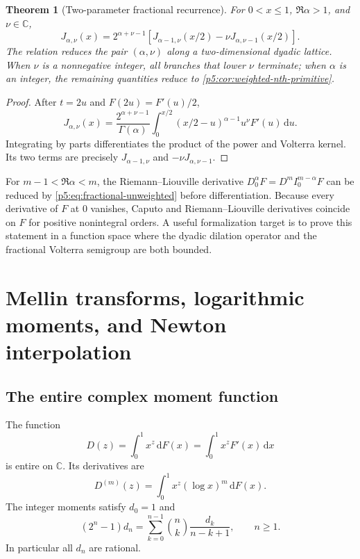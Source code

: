 \documentclass[11pt,oneside]{article}
\newtheorem{theorem}{Theorem}[section]
\theoremstyle{definition}
\theoremstyle{remark}
\newcommand{\C}{\mathbb C}
\newcommand{\dd}{\,\mathrm d}
\newcommand{\1}{\mathbf 1}
\begin{document}
\begin{theorem}[Two-parameter fractional recurrence]\label{p5:thm:fractional-weighted}
For $0<x\le1$, $\Re\alpha>1$, and $\nu\in\C$,
\begin{equation}\label{p5:eq:fractional-weighted}
\boxed{
 J_{\alpha,\nu}(x)=2^{\alpha+\nu-1}
 \left[J_{\alpha-1,\nu}(x/2)
       -\nu J_{\alpha,\nu-1}(x/2)\right].}
\end{equation}
The relation reduces the pair $(\alpha,\nu)$ along a two-dimensional dyadic lattice.  When $\nu$ is a nonnegative integer, all branches that lower $\nu$ terminate; when $\alpha$ is an integer, the remaining quantities reduce to \cref{p5:cor:weighted-nth-primitive}.
\end{theorem}

\begin{proof}
After $t=2u$ and $F(2u)=F'(u)/2$,
\[
 J_{\alpha,\nu}(x)=\frac{2^{\alpha+\nu-1}}{\Gamma(\alpha)}
 \int_0^{x/2}(x/2-u)^{\alpha-1}u^\nu F'(u)\dd u.
\]
Integrating by parts differentiates the product of the power and Volterra kernel.  Its two terms are precisely $J_{\alpha-1,\nu}$ and $-\nu J_{\alpha,\nu-1}$.
\end{proof}

\begin{remark}
For $m-1<\Re\alpha<m$, the Riemann--Liouville derivative
$D_0^\alpha F=D^mI_0^{m-\alpha}F$ can be reduced by \eqref{p5:eq:fractional-unweighted} before differentiation.  Because every derivative of $F$ at $0$ vanishes, Caputo and Riemann--Liouville derivatives coincide on $F$ for positive nonintegral orders.  A useful formalization target is to prove this statement in a function space where the dyadic dilation operator and the fractional Volterra semigroup are both bounded.
\end{remark}

\section{Mellin transforms, logarithmic moments, and Newton interpolation}

\subsection{The entire complex moment function}

\begin{proposition}\label{p5:prop:D-entire}
The function
\[
 D(z)=\int_0^1x^z\dd F(x)=\int_0^1x^zF'(x)\dd x
\]
is entire on $\C$.  Its derivatives are
\begin{equation}\label{p5:eq:D-derivatives}
 D^{(m)}(z)=\int_0^1x^z(\log x)^m\dd F(x).
\end{equation}
The integer moments satisfy $d_0=1$ and
\begin{equation}\label{p5:eq:moment-recurrence}
 (2^n-1)d_n=
 \sum_{k=0}^{n-1}\binom nk\frac{d_k}{n-k+1},
 \qquad n\ge1.
\end{equation}
In particular all $d_n$ are rational.
\end{proposition}
\end{document}
